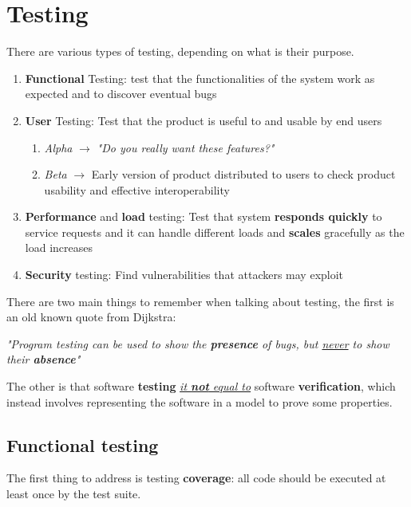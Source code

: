 \chapter{Testing}
There are various types of testing, depending on what is their purpose.

\begin{enumerate}
   \item \textbf{Functional} Testing:
   test that the functionalities of the system work as expected and to discover eventual bugs
   \item \textbf{User} Testing:
   Test that the product is useful to and usable by end users
   \begin{enumerate}
      \item 
      \textit{Alpha} $\longrightarrow$ \textit{"Do you really want these features?"}
      \item
      \textit{Beta} $\longrightarrow$ Early version of product distributed to users to check product usability and effective interoperability
   \end{enumerate}
   \item \textbf{Performance} and \textbf{load} testing:
   Test that system \textbf{responds quickly} to service requests and it can handle different loads and \textbf{scales} gracefully as the load increases
   \item \textbf{Security} testing:
   Find vulnerabilities that attackers may exploit
\end{enumerate}

There are two main things to remember when talking about testing,
the first is an old known quote from Dijkstra:
\begin{center}
   \textit{"Program testing can be used to show the \textbf{presence} of bugs, but \underline{never} to show their \textbf{absence}"}
\end{center}

The other is that software \textbf{testing} \textit{\underline{it \textbf{not} equal to}} software \textbf{verification},
which instead involves representing the software in a model to prove some properties.

\section{Functional testing}
The first thing to address is testing \textbf{coverage}:
all code should be executed at least once by the test suite.

